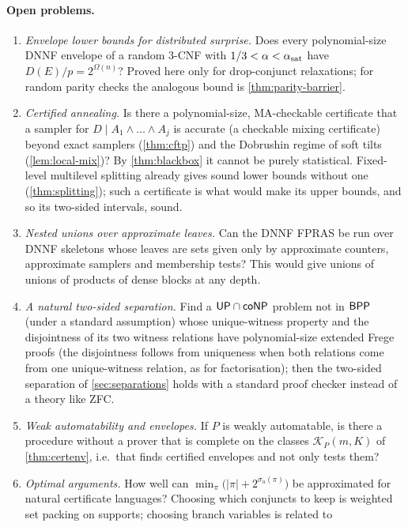 \paragraph{Open problems.}
\begin{enumerate}
\item \emph{Envelope lower bounds for distributed surprise.} Does every
polynomial-size DNNF envelope of a random 3-CNF with $1/3<\alpha<\alpha_{\rm sat}$
have $D(E)/p=2^{\Omega(n)}$? Proved here only for drop-conjunct relaxations; for
random parity checks the analogous bound is \cref{thm:parity-barrier}.
\item \emph{Certified annealing.} Is there a polynomial-size, MA-checkable
certificate that a sampler for $D\mid A_1\wedge\dots\wedge A_j$ is accurate (a
checkable mixing certificate) beyond exact samplers (\cref{thm:cftp}) and the
Dobrushin regime of soft tilts (\cref{lem:local-mix})? By \cref{thm:blackbox} it
cannot be purely statistical. Fixed-level multilevel splitting already gives sound
lower bounds without one (\cref{thm:splitting}); such a certificate is what would make
its upper bounds, and so its two-sided intervals, sound.
\item \emph{Nested unions over approximate leaves.} Can the DNNF FPRAS be run
over DNNF skeletons whose leaves are sets given only by approximate counters,
approximate samplers and membership tests? This would give unions of unions of
products of dense blocks at any depth.
\item \emph{A natural two-sided separation.} Find a $\mathsf{UP}\cap\mathsf{coNP}$
problem not in $\mathsf{BPP}$ (under a standard assumption) whose unique-witness property and
the disjointness of its two witness relations have polynomial-size extended Frege
proofs (the disjointness follows from uniqueness when both relations come from one
unique-witness relation, as for factorisation); then the two-sided separation of
\cref{sec:separations} holds with a standard proof checker instead of a theory like
ZFC.
\item \emph{Weak automatability and envelopes.} If $P$ is weakly automatable, is
there a procedure without a prover that is complete on the classes $\mathcal
K_P(m,K)$ of \cref{thm:certenv}, i.e.\ that finds certified envelopes and not only
tests them?
\item \emph{Optimal arguments.} How well can $\min_\pi\big(|\pi|+2^{\sigma_u(\pi)}\big)$
be approximated for natural certificate languages? Choosing which conjuncts to
keep is weighted set packing on supports; choosing branch variables is related to

\end{enumerate}

